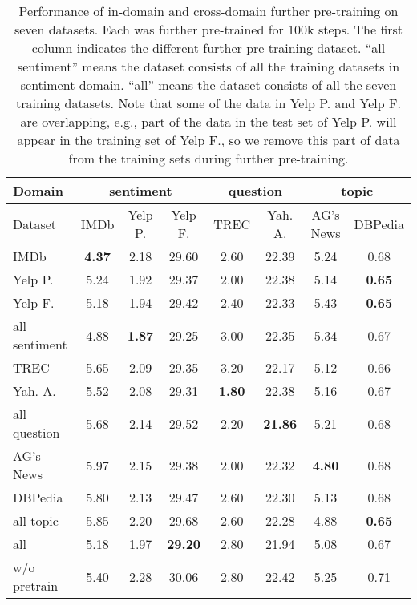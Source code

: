 \documentclass[11pt,a4paper]{article}
\theoremstyle{definition}
\begin{document}
\begin{CJK*}{UTF8}{gbsn}
\begin{table*}[t!]\small\setlength{\tabcolsep}{10pt}
		\centering
		\begin{tabular}{l |c c c| c c| c c}
			\toprule
            Domain & \multicolumn{3}{c}{sentiment} & \multicolumn{2}{|c}{question} & \multicolumn{2}{|c}{topic}\\
			\midrule
Dataset & IMDb & Yelp P. & Yelp F. & TREC & Yah. A. & AG's News & DBPedia  \\
			\midrule
			IMDb & \textbf{4.37} & 2.18 & 29.60 & 2.60 & 22.39 & 5.24 & 0.68 \\
			Yelp P. & 5.24 & 1.92 & 29.37 & 2.00 & 22.38 & 5.14 & \textbf{0.65} \\
			Yelp F. & 5.18 & 1.94 & 29.42 & 2.40 & 22.33 & 5.43 & \textbf{0.65}\\
			all sentiment & 4.88 & \textbf{1.87} & 29.25 & 3.00 & 22.35 & 5.34 & 0.67 \\
			\midrule
			TREC & 5.65 & 2.09 & 29.35 & 3.20 & 22.17 & 5.12 & 0.66 \\
			Yah. A. & 5.52 & 2.08 & 29.31 & \textbf{1.80} & 22.38 & 5.16 & 0.67 \\
			all question & 5.68 & 2.14 & 29.52 & 2.20 & \textbf{21.86} & 5.21 & 0.68 \\
			\midrule
			AG's News & 5.97 & 2.15 & 29.38 & 2.00 & 22.32 & \textbf{4.80} & 0.68 \\
			DBPedia & 5.80 & 2.13 & 29.47 & 2.60 & 22.30 & 5.13 & 0.68 \\
			all topic & 5.85 & 2.20 & 29.68 & 2.60 & 22.28 & 4.88 & \textbf{0.65} \\
			\midrule
			all & 5.18 & 1.97 & \textbf{29.20} & 2.80 & 21.94 & 5.08 & 0.67 \\
\midrule
w/o pretrain & 5.40 & 2.28 & 30.06 & 2.80 & 22.42 & 5.25 & 0.71\\
			
			\bottomrule
		\end{tabular}
		\caption{Performance of in-domain and cross-domain further pre-training on seven datasets. Each was further pre-trained for 100k steps. The first column indicates the different further pre-training dataset. ``all sentiment'' means the dataset consists of all the training datasets in sentiment domain. ``all'' means the dataset consists of all the seven training datasets. Note that some of the data in Yelp P. and Yelp F. are overlapping, e.g., part of the data in the test set of Yelp P. will appear in the training set of Yelp F., so we remove this part of data from the training sets during further pre-training.
		}\label{tb:in-cross}
	\end{table*}


\end{CJK*}
\end{document}
